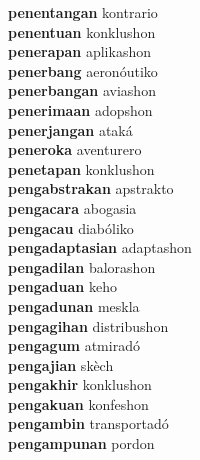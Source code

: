 \textbf{penentangan } kontrario \\
\textbf{penentuan } konklushon \\
\textbf{penerapan } aplikashon \\
\textbf{penerbang } aeronóutiko \\
\textbf{penerbangan } aviashon \\
\textbf{penerimaan } adopshon \\
\textbf{penerjangan } ataká \\
\textbf{peneroka } aventurero \\
\textbf{penetapan } konklushon \\
\textbf{pengabstrakan } apstrakto \\
\textbf{pengacara } abogasia \\
\textbf{pengacau } diabóliko \\
\textbf{pengadaptasian } adaptashon \\
\textbf{pengadilan } balorashon \\
\textbf{pengaduan } keho \\
\textbf{pengadunan } meskla \\
\textbf{pengagihan } distribushon \\
\textbf{pengagum } atmiradó \\
\textbf{pengajian } skèch \\
\textbf{pengakhir } konklushon \\
\textbf{pengakuan } konfeshon \\
\textbf{pengambin } transportadó \\
\textbf{pengampunan } pordon \\
